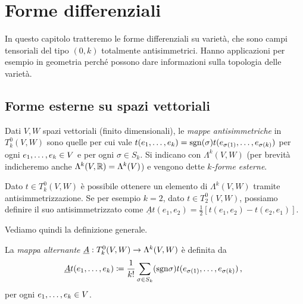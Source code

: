 \chapter{Forme differenziali}

In questo capitolo tratteremo le forme differenziali su varietà, che sono campi tensoriali del tipo $(0,k)$ totalmente antisimmetrici.
Hanno applicazioni per esempio in geometria perché possono dare informazioni sulla topologia delle varietà.

\section{Forme esterne su spazi vettoriali}

\begin{definition}  
Dati $V,W$ spazi vettoriali (finito dimensionali), le \emph{mappe antisimmetriche} in $T^0_k(V,W)$ sono quelle per cui vale $t(\seqb{e}{k}{,}) = \sgn(\sigma) t(e_{\sigma(1)},\ldots, e_{\sigma(k)})$ per ogni $\seqb{e}{k}{,} \in V$ e per ogni $\sigma\in S_k$.
Si indicano con $\Lambda^k(V,W)$ (per brevità indicheremo anche $\Lambda^k(V,\R) = \Lambda^k(V)$) e vengono dette \emph{$k$-forme esterne}.

\end{definition}

Dato $t\in T^0_k(V,W)$ è possibile ottenere un elemento di $\Lambda^k(V,W)$ tramite antisimmetrizzazione.
Se per esempio $k=2$, dato $t\in T^0_2(V,W)$, possiamo definire il suo antisimmetrizzato come $\underline{A}t(e_1,e_2) = \frac 12 [t(e_1,e_2) - t(e_2,e_1)]$.

Vediamo quindi la definizione generale.

\begin{definition} 
	La \emph{mappa alternante} $\antisimm:T^0_k(V,W) \to \Lambda^k(V,W)$ è definita da
	\begin{equation*}
		\antisimm t(\seqb{e}{k}{,}) \coloneqq \frac 1 {k!} \sum_{\sigma \in S_k} (\sgn \sigma) t(e_{\sigma(1)},\ldots, e_{\sigma(k)}) \virgola
	\end{equation*}
	per ogni $\seqb{e}{k}{,} \in V$.
\end{definition}

